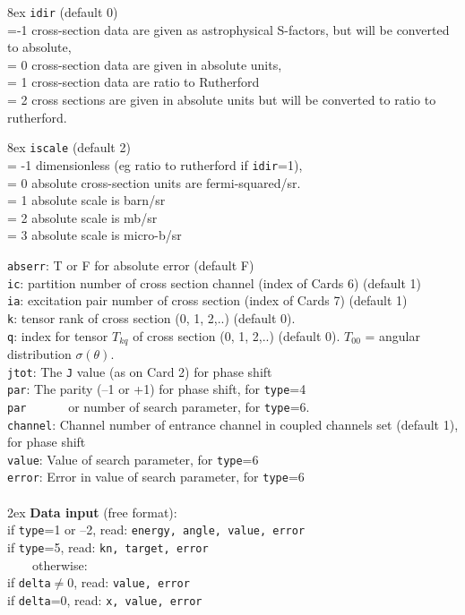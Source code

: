 \documentclass[11pt]{article}
\begin{document}
\hangindent 8ex
{\tt idir} (default 0)
\\ =-1 cross-section data are given as astrophysical S-factors, but will be converted to absolute,
\\ = 0 cross-section data are given in absolute units,
\\ = 1 cross-section data are ratio to Rutherford
\\ = 2 cross sections are given in absolute units but will be
         converted to ratio to rutherford.



\hangindent 8ex
{\tt iscale} (default 2)
\\ = -1 dimensionless (eg ratio to rutherford if {\tt idir}=1),
\\ = 0 absolute cross-section units are fermi-squared/sr.
\\ = 1 absolute scale is barn/sr
\\ = 2 absolute scale is mb/sr
\\ = 3 absolute scale is micro-b/sr


{\tt abserr}: T or F for absolute error (default F)\\
{\tt ic}: partition number of cross section channel (index of Cards 6)  (default 1)\\
{\tt ia}: excitation pair number of cross section (index of Cards 7)  (default 1)\\
{\tt k}: tensor rank of cross section (0, 1, 2,..) (default 0). \\
{\tt q}: index for tensor $T_{kq}$ of cross section (0, 1, 2,..) (default 0).
    $T_{00}$ = angular distribution $\sigma(\theta)$.\\
{\tt jtot}: The {\tt J} value (as on Card 2) for phase shift\\
{\tt par}: The parity (--1 or +1) for phase shift, for {\tt type}=4\\
{\tt par}~~~~~~ or number of search parameter, for {\tt type}=6.\\
{\tt channel}: Channel number of entrance channel in coupled channels set (default 1),
for phase shift\\
{\tt value}: Value of search parameter, for {\tt type}=6\\
{\tt error}: Error in value of search parameter, for {\tt type}=6\\
~\\

\hangindent 2ex
{\bf Data input} (free format):
\\ if {\tt type}=1 or --2, read:  {\tt energy, angle, value, error}
\\ if {\tt type}=5, read:  {\tt kn, target, error}
\\ ~~~~otherwise:
\\ if {\tt delta}$\ne$0, read:  {\tt value, error}
\\ if {\tt delta}=0, read:  {\tt x, value, error}
\end{document}
